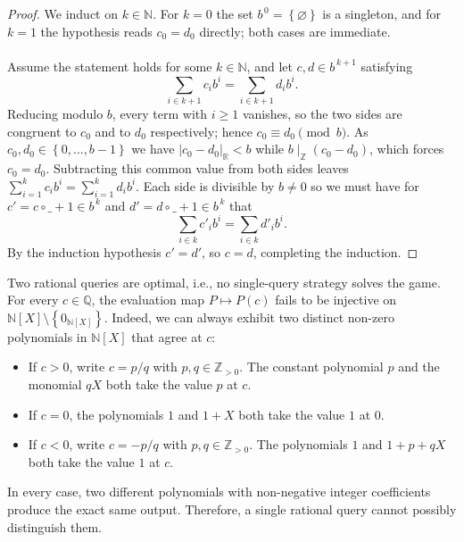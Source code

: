 \begin{solution}
    \begin{proof}
        We induct on \( k\in\mathbb{N} \). For \( k=0 \) the set \( b^{\,0}=\left\{\varnothing\right\} \) is a singleton, and for \( k=1 \) the hypothesis reads \( c_0=d_0 \) directly; both cases are immediate.
        \\\\
        Assume the statement holds for some \( k\in\mathbb{N} \), and let \( c,d\in b^{\,k+1} \) satisfying
        \[
            \sum_{i\in k+1}c_i b^i=\sum_{i\in k+1}d_i b^i .
        \]
        Reducing modulo \( b \), every term with \( i\ge 1 \) vanishes, so the two sides are congruent to \( c_0 \) and to \( d_0 \) respectively; hence \( c_0\equiv d_0\pmod b \). As \( c_0,d_0\in\left\{0,\dots,b-1\right\} \) we have \( |c_0-d_0|_{\mathbb{R}}<b \) while \( b\mid_{\mathbb{Z}}\left(c_0-d_0\right) \), which forces \( c_0=d_0 \). Subtracting this common value from both sides leaves \( \sum_{i=1}^{k}c_i b^{i}=\sum_{i=1}^{k}d_i b^{i} \). Each side is divisible by \( b\neq 0 \) so we must have for \( c'=c\circ\_+1\in b^{\, k} \) and \( d'=d\circ\_+1\in b^{\, k} \) that
        \[
            \sum_{i\in k}c'_i b^i=\sum_{i\in k}d'_i b^{i}.
        \]
        By the induction hypothesis \( c'=d' \), so \( c=d \), completing the induction.
    \end{proof}
    \begin{remark}
        Two rational queries are optimal, i.e., no single-query strategy solves the game. For every \( c\in\mathbb{Q} \), the evaluation map \( P\mapsto P\left(c\right) \) fails to be injective on \( \mathbb{N}\left[X\right]\setminus\left\{0_{\mathbb{N}\left[X\right]}\right\} \). Indeed, we can always exhibit two distinct non-zero polynomials in \( \mathbb{N}\left[X\right] \) that agree at \( c \):
        \begin{itemize}
            \item If \( c > 0 \), write \( c = p/q \) with \( p,q \in \mathbb{Z}_{>0} \). The constant polynomial \( p \) and the monomial \( qX \) both take the value \( p \) at \( c \).
            \item If \( c = 0 \), the polynomials \( 1 \) and \( 1+X \) both take the value \( 1 \) at \( 0 \).
            \item If \( c < 0 \), write \( c = -p/q \) with \( p,q \in \mathbb{Z}_{>0} \). The polynomials \( 1 \) and \( 1+p+qX \) both take the value \( 1 \) at \( c \).
        \end{itemize}
        In every case, two different polynomials with non-negative integer coefficients produce the exact same output. Therefore, a single rational query cannot possibly distinguish them.

\end{remark}
\end{solution}
